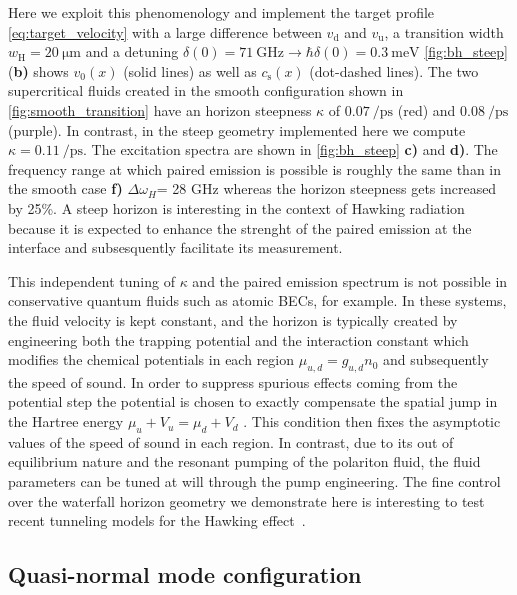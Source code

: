 Here we exploit this phenomenology and implement the target profile \autoref{eq:target_velocity} with a large difference between $v_\mathrm{d}$ and $v_\mathrm{u}$, a transition width $w_\mathrm{H}=\SI{20}{\micro\meter}$ and a detuning $\delta(0)=\SI{71}{\giga\hertz} \rightarrow\hbar\delta(0)=\SI{0.3}{\milli \electronvolt}$
\autoref{fig:bh_steep} (\textbf{b)} shows $v_0(x)$ (solid lines) as well as $c_\mathrm{s}(x)$ (dot-dashed lines). The two supercritical fluids created in the smooth configuration shown in \autoref{fig:smooth_transition}
have an horizon steepness $\kappa$ of $\SI{0.07}{\per \pico \second}$ (red) and $\SI{0.08}{\per \pico \second}$ (purple). In contrast, in the steep geometry implemented here we compute $\kappa = \SI{0.11}{\per \pico \second}$. The excitation spectra are shown in \autoref{fig:bh_steep} \textbf{c)} and \textbf{d)}.
The frequency range at which paired emission is possible is roughly the same than in the smooth case \textbf{f)} $\Delta \omega_H$= 28 GHz whereas the horizon steepness 
gets increased by 25\%. A steep horizon is interesting in the context of Hawking radiation because it is expected to enhance the strenght of the paired emission at the interface and subsesquently facilitate its measurement. 


This independent tuning of $\kappa$ and the paired emission spectrum is not possible in conservative quantum fluids such as atomic BECs, for example. In these systems, the fluid velocity is kept constant, and the horizon is typically created by engineering 
both the trapping potential and the interaction constant which modifies the chemical potentials in each region $\mu _{u,d}=g_{u,d}n_0$ and subsequently the speed of sound. In order to suppress spurious effects coming from the potential step 
the potential is chosen to exactly compensate the spatial jump in the Hartree energy $\mu_u+ V_u=\mu_d+V_d$ \cite{Recati_acousticHR_2009}. This condition then fixes the asymptotic values of the speed of sound in each region.
In contrast, due to its out of equilibrium nature and the resonant pumping of the polariton fluid, the fluid parameters can be tuned at will through the pump engineering.
The fine control over the waterfall horizon geometry we demonstrate here is interesting to test recent tunneling models for the Hawking effect~\cite{delporro2024tunneling}.




\subsection{Quasi-normal mode configuration}

